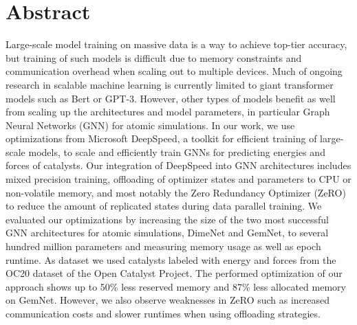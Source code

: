 \section*{Abstract}

Large-scale model training on massive data is a way to achieve top-tier 
accuracy, but training of such models is difficult due to memory constraints and communication overhead 
when scaling out to multiple devices. Much of ongoing research in scalable machine learning is 
currently limited to  giant transformer models such as Bert or GPT-3. However, other types of 
models benefit as well from scaling up the architectures and model parameters, 
in particular Graph Neural Networks (GNN) for atomic simulations. In our work, 
we use optimizations from Microsoft DeepSpeed, a toolkit for efficient training 
of large-scale models, to scale and efficiently train GNNs for predicting energies 
and forces of catalysts. Our integration of DeepSpeed into GNN architectures includes 
mixed precision training, offloading of optimizer states and parameters to CPU or non-volatile 
memory, and most notably the Zero Redundancy Optimizer (ZeRO) to reduce the amount of 
replicated states during data parallel training. We evaluated our optimizations by increasing 
the size of the two most successful GNN architectures for atomic simulations, DimeNet 
and GemNet, to several hundred million parameters and measuring memory usage as well as epoch 
runtime. As dataset we used catalysts labeled with energy and forces from the OC20 dataset of 
the Open Catalyst Project. The performed optimization of our approach shows up to 
50\% less reserved memory and 87\% less allocated memory on GemNet. However, we also observe 
weaknesses in ZeRO such as increased communication costs and slower 
runtimes when using offloading strategies. 